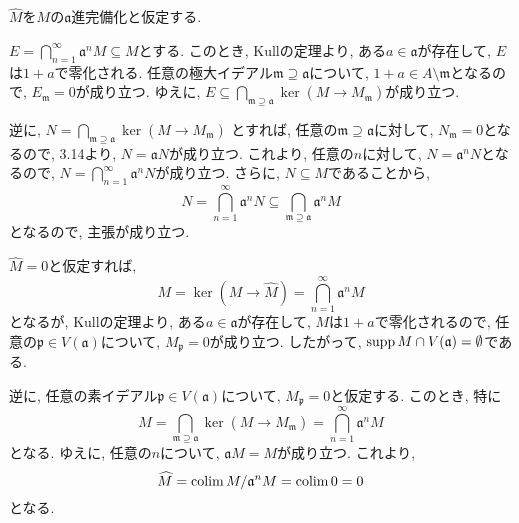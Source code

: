 \documentclass[dvipdfmx]{jsarticle}
\begin{document}
    \begin{problem}

    \end{problem}

    \begin{problem}

    \end{problem}

    $\widehat{M}$を$M$の$\mathfrak{a}$進完備化と仮定する.
    \begin{problem}
        $E = \bigcap_{n = 1}^\infty \mathfrak{a}^n M \subseteq M$とする.
        このとき, Kullの定理より, ある$a \in \mathfrak{a}$が存在して,
        $E$は$1+a$で零化される.
        任意の極大イデアル$\mathfrak{m} \supseteq \mathfrak{a}$について,
        $1 + a \in A\setminus \mathfrak{m}$となるので,
        $E_\mathfrak{m} = 0$が成り立つ.
        ゆえに, $E \subseteq \bigcap_{\mathfrak{m} \supseteq \mathfrak{a}} \ker(M \to M_\mathfrak{m})$が成り立つ.

        逆に, $N = \bigcap_{\mathfrak{m} \supseteq \mathfrak{a}} \ker(M \to M_\mathfrak{m})$
        とすれば, 任意の$\mathfrak{m} \supseteq \mathfrak{a}$に対して,
        $N_\mathfrak{m} = 0$となるので, 3.14より,
        $N = \mathfrak{a}N$が成り立つ.
        これより, 任意の$n$に対して, $N = \mathfrak{a}^n N$となるので,
        $N = \bigcap_{n = 1}^\infty \mathfrak{a}^n N$が成り立つ.
        さらに, $N \subseteq M$であることから,
        \[
            N = \bigcap_{n = 1}^\infty \mathfrak{a}^n N \subseteq \bigcap_{\mathfrak{m} \supseteq \mathfrak{a}} \mathfrak{a}^nM
        \]
        となるので, 主張が成り立つ.

        $\widehat{M} = 0$と仮定すれば,
        \[
            M = \ker(M \to \widehat{M}) = \bigcap_{n = 1}^\infty \mathfrak{a}^nM
        \]
        となるが, Kullの定理より, ある$a \in \mathfrak{a}$が存在して, $M$は$1+a$で零化されるので,
        任意の$\mathfrak{p} \in V(\mathfrak{a})$について, $M_\mathfrak{p} = 0$が成り立つ.
        したがって, $\operatorname{supp}{M} \cap V(\mathfrak{a}) = \emptyset$である.

        逆に, 任意の素イデアル$\mathfrak{p} \in V(\mathfrak{a})$について,
        $M_\mathfrak{p} = 0$と仮定する.
        このとき, 特に
        \[
            M = \bigcap_{\mathfrak{m} \supseteq \mathfrak{a}} \ker(M \to M_\mathfrak{m}) = \bigcap_{n = 1}^\infty \mathfrak{a}^n M
        \]
        となる.
        ゆえに, 任意の$n$について, $\mathfrak{a}M = M$が成り立つ.
        これより,
        \[
            \widehat{M} = \operatorname*{colim} M/\mathfrak{a}^nM = \operatorname*{colim} 0 = 0
        \]
        となる.
    \end{problem}
\end{document}
